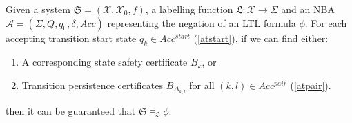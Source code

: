 \documentclass[acmlarge]{acmart}
\begin{document}
\begin{theorem}
  \label{ltl-thm}
   Given a system $\mathfrak{S} = (\mathcal{X}, \mathcal{X}_0, f)$, a labelling function $\mathfrak{L}: \mathcal{X} \rightarrow \Sigma$ and an NBA $\mathcal{A} = (\Sigma, Q, q_0, \delta, Acc)$ representing the negation of an LTL formula $\phi$. For each accepting transition start state $q_k \in Acc^{start}$ (\ref{atstart}), if we can find either:
  \begin{enumerate}
      \item A corresponding state safety certificate $B_k$, or
      \item Transition persistence certificates $B_{\Delta_{k,l}}$ for all $(k, l) \in Acc^{pair}$ (\ref{atpair}).
  \end{enumerate}
  then it can be guaranteed that $\mathfrak{S} \models_{\mathfrak{L}} \phi$.
\end{theorem}
\end{document}
